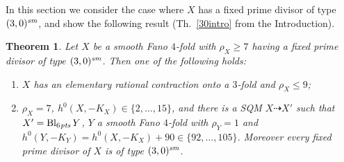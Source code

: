 \documentclass[a4paper,12pt]{amsart}
\newtheorem{thm}{Theorem}[section]
\theoremstyle{definition}
\numberwithin{figure}{section}
\numberwithin{table}{section}
\newcommand{\Bl}{\operatorname{Bl}}
\newcommand{\sm}{\text{\it sm}}
\newcommand{\pts}{\text{\it pts}}
\begin{document}
In this section we consider the case where $X$ has a fixed prime divisor of type $(3,0)^{\sm}$, and show the following result (Th.~\ref{30intro} from the Introduction).
\begin{thm}\label{30}
Let $X$ be a smooth Fano $4$-fold with $\rho_X\geq 7$ having a fixed prime divisor of type $(3,0)^{\sm}$. Then one of the following holds:
  \begin{enumerate}[$(i)$]
  \item  $X$ has an elementary rational contraction onto a $3$-fold and $\rho_X\leq 9$;
  \item $\rho_X=7$,
$h^0(X,-K_X)\in\{2,\dotsc,15\}$,
and there is a SQM $X\dasharrow X'$ such that $X'=\Bl_{6\mskip1mu\pts}Y$, $Y$ a smooth Fano $4$-fold with $\rho_Y=1$ and $h^0(Y,-K_Y)=h^0(X,-K_X)+90\in\{92,\dotsc, 105\}$. Moreover every fixed prime divisor of $X$ is of type $(3,0)^{\sm}$.
    \end{enumerate}
\end{thm}
\end{document}
